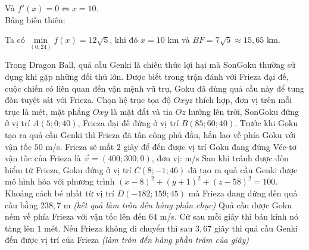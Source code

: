 \begin{ex}
{\begin{itemchoice}
			Và $f'(x)=0\Leftrightarrow x=10$.\\
			Bảng biến thiên:
			\begin{center}
			\end{center}
			Ta có $\min\limits_{(0 ; 24)} f(x)=12 \sqrt{5}$, khi đó $x=10$ km và $B F=7 \sqrt{5}\approx 15{,}65$ km.
		\end{itemchoice}
	}
\end{ex}

\begin{ex}%
	Trong Dragon Ball, quả cầu Genki là chiêu thức lợi hại mà SonGoku thường sử dụng khi gặp những đối thủ lớn. Được biết trong trận đánh với Frieza đại đế, cuộc chiến có liên quan đến vận mệnh vũ trụ, Goku đã dùng quả cầu này để tung đòn tuyệt sát với Frieza.
	Chọn hệ trục tọa độ $Oxyz$ thích hợp, đơn vị trên mỗi trục là mét, mặt phẳng $Oxy$ là mặt đất và tia $Oz$ hướng lên trời, SonGoku đứng ở vị trí $A(5;0;40)$, Frieza đại đế đứng ở vị trí $B(85;60;40)$. Trước khi Goku tạo ra quả cầu Genki thì Frieza đã tấn công phủ đầu, hắn lao về phía Goku với vận tốc $50$ m/s.
	\choiceTF
	{\True Frieza sẽ mất $2$ giây để đến được vị trí Goku đang đứng}
	{Véc-tơ vận tốc của Frieza là $\overrightarrow{v}=(400;300;0)$, đơn vị: m/s}
	{\True Sau khi tránh được đòn hiểm từ Frieza, Goku đứng ở vị trí $C(8;-1; 46)$ đã tạo ra quả cầu Genki được mô hình hóa với phương trình $(x-8)^2+(y+1)^2+(z-58)^2=100$. Khoảng cách bé nhất từ vị trí $D(-182; 159; 45)$ mà Frieza đang đứng đến quả cầu bằng $238{,}7$ m \textit{(kết quả làm tròn đến hàng phần chục)}}
	{\True Quả cầu được Goku ném về phía Frieza với vận tốc lên đến $64$ m/s. Cứ sau mỗi giây thì bán kính nó tăng lên $1$ mét. Nếu Frieza không di chuyển thì sau $3{,}67$ giây thì quả cầu Genki đến được vị trí của Frieza \textit{(làm tròn đến hàng phần trăm của giây)}}
\end{ex}
